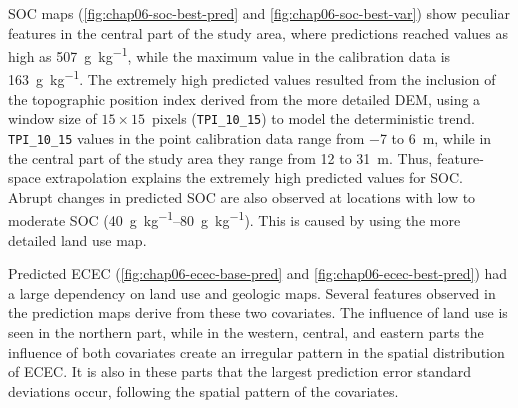 SOC maps (\autoref{fig:chap06-soc-best-pred} and \autoref{fig:chap06-soc-best-var}) show peculiar features in 
the central part of the study area, where predictions reached values as high as \SI{507}{\gram\per\kilo\gram}, 
while the maximum value in the calibration data is \SI{163}{\gram\per\kilo\gram}. The extremely high predicted 
values resulted from the inclusion of the topographic position index derived from the more detailed DEM, using 
a window size of $15 \times 15$~pixels (\texttt{TPI\_10\_15}) to model the deterministic trend. 
\texttt{TPI\_10\_15} values in the point calibration data range from \num{-7} to \SI{6}{\m}, while in the 
central part of the study area they range from \num{12} to \SI{31}{\m}. Thus, feature-space extrapolation 
explains the extremely high predicted values for SOC. Abrupt changes in predicted SOC are also observed at 
locations with low to moderate SOC (\SIrange{40}{80}{\gram\per\kilo\gram}). This is caused by using the more 
detailed land use map.

Predicted ECEC (\autoref{fig:chap06-ecec-base-pred} and \autoref{fig:chap06-ecec-best-pred}) had a large 
dependency on land use and geologic maps. Several features observed in the prediction maps derive from these 
two covariates. The influence of land use is seen in the northern part, while in the western, central, and 
eastern parts the influence of both covariates create an irregular pattern in the spatial distribution of 
ECEC. It is also in these parts that the largest prediction error standard deviations occur, following the 
spatial pattern of the covariates.

